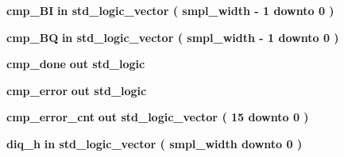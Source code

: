 \begin{DoxyCompactItemize}
\item 
{\bf cmp\+\_\+\+BI}  {\bfseries {\bfseries \textcolor{keywordflow}{in}\textcolor{vhdlchar}{ }}} {\bfseries \textcolor{comment}{std\+\_\+logic\+\_\+vector}\textcolor{vhdlchar}{ }\textcolor{vhdlchar}{(}\textcolor{vhdlchar}{ }\textcolor{vhdlchar}{ }\textcolor{vhdlchar}{ }\textcolor{vhdlchar}{ }{\bfseries {\bf smpl\+\_\+width}} \textcolor{vhdlchar}{-\/}\textcolor{vhdlchar}{ } \textcolor{vhdldigit}{1} \textcolor{vhdlchar}{ }\textcolor{keywordflow}{downto}\textcolor{vhdlchar}{ }\textcolor{vhdlchar}{ } \textcolor{vhdldigit}{0} \textcolor{vhdlchar}{ }\textcolor{vhdlchar}{)}\textcolor{vhdlchar}{ }} 
\item 
{\bf cmp\+\_\+\+BQ}  {\bfseries {\bfseries \textcolor{keywordflow}{in}\textcolor{vhdlchar}{ }}} {\bfseries \textcolor{comment}{std\+\_\+logic\+\_\+vector}\textcolor{vhdlchar}{ }\textcolor{vhdlchar}{(}\textcolor{vhdlchar}{ }\textcolor{vhdlchar}{ }\textcolor{vhdlchar}{ }\textcolor{vhdlchar}{ }{\bfseries {\bf smpl\+\_\+width}} \textcolor{vhdlchar}{-\/}\textcolor{vhdlchar}{ } \textcolor{vhdldigit}{1} \textcolor{vhdlchar}{ }\textcolor{keywordflow}{downto}\textcolor{vhdlchar}{ }\textcolor{vhdlchar}{ } \textcolor{vhdldigit}{0} \textcolor{vhdlchar}{ }\textcolor{vhdlchar}{)}\textcolor{vhdlchar}{ }} 
\item 
{\bf cmp\+\_\+done}  {\bfseries {\bfseries \textcolor{keywordflow}{out}\textcolor{vhdlchar}{ }}} {\bfseries \textcolor{comment}{std\+\_\+logic}\textcolor{vhdlchar}{ }} 
\item 
{\bf cmp\+\_\+error}  {\bfseries {\bfseries \textcolor{keywordflow}{out}\textcolor{vhdlchar}{ }}} {\bfseries \textcolor{comment}{std\+\_\+logic}\textcolor{vhdlchar}{ }} 
\item 
{\bf cmp\+\_\+error\+\_\+cnt}  {\bfseries {\bfseries \textcolor{keywordflow}{out}\textcolor{vhdlchar}{ }}} {\bfseries \textcolor{comment}{std\+\_\+logic\+\_\+vector}\textcolor{vhdlchar}{ }\textcolor{vhdlchar}{(}\textcolor{vhdlchar}{ }\textcolor{vhdlchar}{ } \textcolor{vhdldigit}{15} \textcolor{vhdlchar}{ }\textcolor{keywordflow}{downto}\textcolor{vhdlchar}{ }\textcolor{vhdlchar}{ } \textcolor{vhdldigit}{0} \textcolor{vhdlchar}{ }\textcolor{vhdlchar}{)}\textcolor{vhdlchar}{ }} 
\item 
{\bf diq\+\_\+h}  {\bfseries {\bfseries \textcolor{keywordflow}{in}\textcolor{vhdlchar}{ }}} {\bfseries \textcolor{comment}{std\+\_\+logic\+\_\+vector}\textcolor{vhdlchar}{ }\textcolor{vhdlchar}{(}\textcolor{vhdlchar}{ }\textcolor{vhdlchar}{ }\textcolor{vhdlchar}{ }\textcolor{vhdlchar}{ }{\bfseries {\bf smpl\+\_\+width}} \textcolor{vhdlchar}{ }\textcolor{keywordflow}{downto}\textcolor{vhdlchar}{ }\textcolor{vhdlchar}{ } \textcolor{vhdldigit}{0} \textcolor{vhdlchar}{ }\textcolor{vhdlchar}{)}\textcolor{vhdlchar}{ }} 

\end{DoxyCompactItemize}
